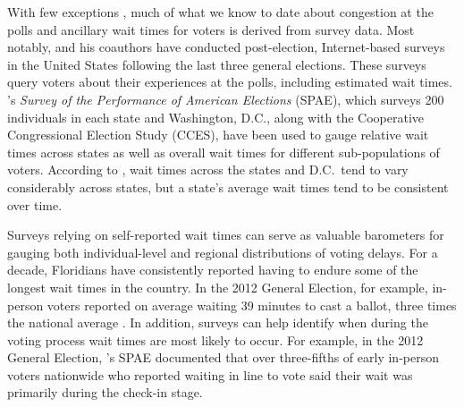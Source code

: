 \documentclass[12pt,titlepage]{article}
\begin{document}
With few exceptions
\citep{spencermarkovits:renege,herronsmith:hanoverstudy,pettigrew:longlinesminorityprecincts},
much of what we know to date about congestion at the polls and
ancillary wait times for voters is derived from survey data. Most
notably, \citet{stewart:waitingtovote2012} and his coauthors have
conducted post-election, Internet-based surveys in the United States
following the last three general elections.  These surveys query
voters about their experiences at the polls, including estimated wait
times.  \citeauthor{stewart:waitingtovote2012}'s \emph{Survey of the
  Performance of American Elections} (SPAE), which surveys 200
individuals in each state and Washington, D.C., along with the
Cooperative Congressional Election Study (CCES), have been used to
gauge relative wait times across states as well as overall wait times
for different sub-populations of voters.  According to
\citeauthor{stewart:waitingtovote2012}, wait times across the states
and D.C.\ tend to vary considerably across states, but a state's
average wait times tend to be consistent over time.

Surveys relying on self-reported wait times can serve as valuable
barometers for gauging both individual-level and regional
distributions of voting delays.  For a decade, Floridians have
consistently reported having to endure some of the longest wait times
in the country. In the 2012 General Election, for example, in-person
voters reported on average waiting 39 minutes to cast a ballot, three
times the national average \citep{stewart:waitingtovote2012}. In addition, 
surveys can help identify when during the voting process wait times are most likely to occur.
For example, in the 2012 General Election, \citeauthor{stewart:waitingtovote2012}'s SPAE 
documented that over three-fifths of early in-person voters nationwide who reported 
waiting in line to vote said their wait was primarily during the check-in stage.
\end{document}
